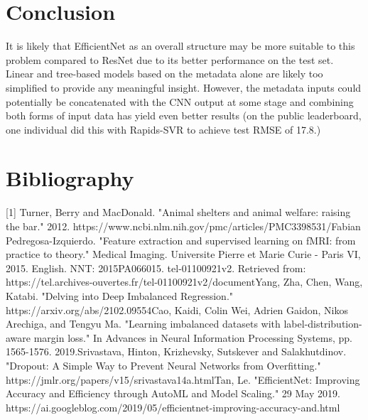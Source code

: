 \documentclass[12pt]{article}
\begin{document}
\section{Conclusion}

It is likely that EfficientNet as an overall structure may be more suitable to this problem compared to ResNet due to its better performance on the test set. Linear and tree-based models based on the metadata alone are likely too simplified to provide any meaningful insight. However, the metadata inputs could potentially be concatenated with the CNN output at some stage and combining both forms of input data has yield even better results (on the public leaderboard, one individual did this with Rapids-SVR to achieve test RMSE of 17.8.)

\section{Bibliography}

[1] Turner, Berry and MacDonald. "Animal shelters and animal welfare: raising the bar." 2012.\newline
https://www.ncbi.nlm.nih.gov/pmc/articles/PMC3398531/\newline
[2] Fabian Pedregosa-Izquierdo. "Feature extraction and supervised learning on fMRI: from practice to theory." Medical Imaging. Universite Pierre et Marie Curie - Paris VI, 2015. English. NNT: 2015PA066015. tel-01100921v2. Retrieved from: https://tel.archives-ouvertes.fr/tel-01100921v2/document\newline
[3] Yang, Zha, Chen, Wang, Katabi. "Delving into Deep Imbalanced Regression." https://arxiv.org/abs/2102.09554\newline
[4] Cao, Kaidi, Colin Wei, Adrien Gaidon, Nikos Arechiga, and Tengyu Ma. "Learning imbalanced datasets with label-distribution-aware margin loss." In Advances in Neural Information Processing Systems, pp. 1565-1576. 2019.\newline
[5] Srivastava, Hinton, Krizhevsky, Sutskever and Salakhutdinov. "Dropout: A Simple Way to Prevent Neural Networks from Overfitting." https://jmlr.org/papers/v15/srivastava14a.html\newline
[6] Tan, Le. "EfficientNet: Improving Accuracy and Efficiency through AutoML and Model Scaling." 29 May 2019. https://ai.googleblog.com/2019/05/efficientnet-improving-accuracy-and.html
\end{document}
